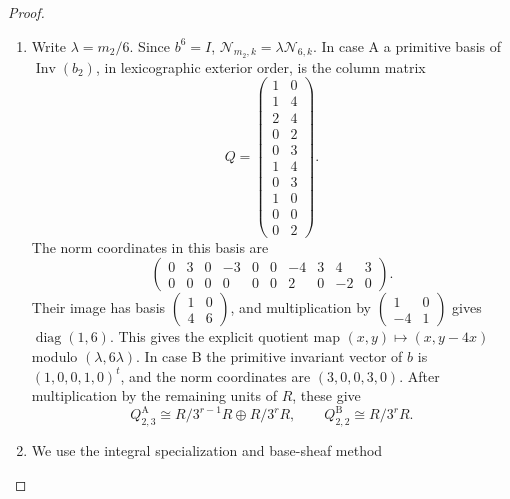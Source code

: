 \documentclass[11pt,a4paper]{article}
\numberwithin{equation}{section}
\theoremstyle{definition}
\begin{document}
\begin{proof}
\begin{enumerate}[label=\arabic*.]
The covering map on the horizontal term of the Wang
sequence is the norm
\[
 \mathcal N_{m_2,k}=\sum_{j=0}^{m_2-1}b_k^j:
 \operatorname{coker}(b_k-I)\longrightarrow\operatorname{Inv}(b_k).
\]
Indeed, the lift is the union of the $m_2$ successive prisms
with their transported coefficients.  On the vertical invariant
quotient pullback is the identity.  Consequently horizontal
inclusion induces the isomorphism
\[
 \frac{\operatorname{Inv}(b_{q-1})}
      {\mathcal N_{m_2,q-1}\bigwedge^{q-1}R^5}
 \ \xrightarrow{\ \sim\ }\
 \frac{\operatorname{Inv}(\bigwedge^q V_R)}{J_{2,q}}.
\]
Surjectivity follows by subtracting a restriction with the same
vertical component; its kernel is exactly the horizontal norm
image.

\item Write $\lambda=m_2/6$.  Since $b^6=I$,
$\mathcal N_{m_2,k}=\lambda\mathcal N_{6,k}$.
In case A a primitive basis of $\operatorname{Inv}(b_2)$,
in lexicographic exterior order, is the column matrix
\[
 Q=\begin{pmatrix}
 1&0\\1&4\\2&4\\0&2\\0&3\\1&4\\0&3\\1&0\\0&0\\0&2
 \end{pmatrix}.
\]
The norm coordinates in this basis are
\[
 \begin{pmatrix}
 0&3&0&-3&0&0&-4&3&4&3\\
 0&0&0&0&0&0&2&0&-2&0
 \end{pmatrix}.
\]
Their image has basis $\left(\begin{smallmatrix}1&0\\4&6\end{smallmatrix}\right)$,
and multiplication by
$\left(\begin{smallmatrix}1&0\\-4&1\end{smallmatrix}\right)$
gives $\operatorname{diag}(1,6)$.  This gives the explicit quotient
map $(x,y)\mapsto(x,y-4x)$ modulo $(\lambda,6\lambda)$.
In case B the primitive invariant vector of $b$ is
$(1,0,0,1,0)^t$, and the norm coordinates are $(3,0,0,3,0)$.
After multiplication by the remaining units of $R$, these give
\[
 Q_{2,3}^{\mathrm A}\cong R/3^{r-1}R\oplus R/3^rR,
 \qquad Q_{2,2}^{\mathrm B}\cong R/3^rR.
\]
\item We use the integral specialization and base-sheaf method

\end{enumerate}
\end{proof}
\end{document}
